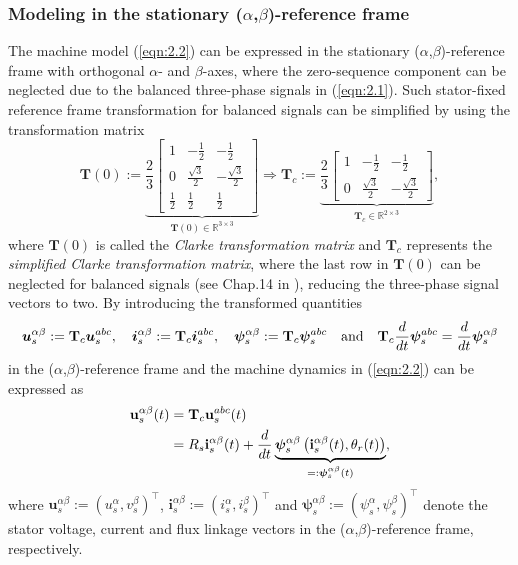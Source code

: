 \subsubsection{Modeling in the stationary  ($\alpha$,$\beta$)-reference frame}
The machine model (\ref{eqn:2.2}) can be expressed in the stationary ($\alpha$,$\beta$)-reference frame with orthogonal $\alpha$- and $\beta$-axes, where the zero-sequence component can be neglected due to the balanced three-phase signals in (\ref{eqn:2.1}). Such stator-fixed reference frame transformation for balanced signals can be simplified by using the transformation matrix
\begin{equation}\label{eqn:2.4}
\mathbf{T}(0) := \underbrace{\frac{2}{3} \begin{bmatrix}
1 & -\frac{1}{2} & -\frac{1}{2} \\
0 & \frac{\sqrt{3}}{2} & -\frac{\sqrt{3}}{2}\\
\frac{1}{2} & \frac{1}{2} & \frac{1}{2}
\end{bmatrix}}_{\mathbf{T}(0)\in \mathbb{R}^{3\times3}} \Rightarrow 
\mathbf{T}_c := \underbrace{\frac{2}{3} \begin{bmatrix}
1 & -\frac{1}{2} & -\frac{1}{2} \\
0 & \frac{\sqrt{3}}{2} & -\frac{\sqrt{3}}{2} 
\end{bmatrix}}_{\mathbf{T}_c\in \mathbb{R}^{2\times3}},
\end{equation}
where $\mathbf{T}(0)$ is called the \emph{Clarke transformation matrix} and $\mathbf{T}_c$ represents the \emph{simplified Clarke transformation matrix}, where the last row in $\mathbf{T}(0)$ can be neglected for balanced signals (see Chap.14 in \cite{c2.1_3}), reducing the three-phase signal vectors to two. By introducing the transformed quantities 
\begin{equation}\notag
\bm{u}_s^{\alpha\beta} := \mathbf{T}_c \bm{u}_s^{abc}, \quad \bm{i}_s^{\alpha\beta} := \mathbf{T}_c \bm{i}_s^{abc}, \quad \bm{\psi}_s^{\alpha\beta} := \mathbf{T}_c \bm{\psi}_s^{abc} \quad \text{and} \quad \mathbf{T}_c \frac{d}{dt} \bm{\psi}_s^{abc} = \frac{d}{dt} \bm{\psi}_s^{\alpha\beta}
\end{equation}
in the ($\alpha$,$\beta$)-reference frame and the machine dynamics in (\ref{eqn:2.2}) can be expressed as 
\begin{align}\label{eqn:2.5}\notag
\mathbf{u}^{\alpha\beta}_s(t) &= \mathbf{T}_c \mathbf{u}^{abc}_s(t) \\
&= R_s \mathbf{i}^{\alpha\beta}_s(t) + \frac{d}{dt}\underbrace{\bm{\psi}^{\alpha\beta}_s\left(\mathbf{i}^{\alpha\beta}_s(t),\theta_r(t) \right)}_{=:\bm{\psi}^{\alpha\beta}_s(t)},
\end{align}
where $\mathbf{u}^{\alpha\beta}_s := (u^\alpha_s, v^\beta_s)^\top$, $\mathbf{i}^{\alpha\beta}_s := (i^\alpha_s, i^\beta_s)^\top$ and $\bm{\psi}^{\alpha\beta}_s := (\psi^\alpha_s, \psi^\beta_s)^\top$ denote the stator voltage, current and flux linkage vectors in the ($\alpha$,$\beta$)-reference frame, respectively. 

